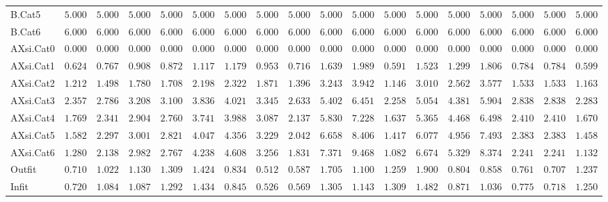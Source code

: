 \documentclass[6pt]{article}
\begin{document}
{\begin{longtable}{lrrrrrrrrrrrrrrrrr}
B.Cat5&$ 5.000$&$ 5.000$&$ 5.000$&$ 5.000$&$ 5.000$&$ 5.000$&$ 5.000$&$ 5.000$&$ 5.000$&$ 5.000$&$ 5.000$&$ 5.000$&$ 5.000$&$ 5.000$&$ 5.000$&$ 5.000$&$ 5.000$\tabularnewline
B.Cat6&$ 6.000$&$ 6.000$&$ 6.000$&$ 6.000$&$ 6.000$&$ 6.000$&$ 6.000$&$ 6.000$&$ 6.000$&$ 6.000$&$ 6.000$&$ 6.000$&$ 6.000$&$ 6.000$&$ 6.000$&$ 6.000$&$ 6.000$\tabularnewline
AXsi.Cat0&$ 0.000$&$ 0.000$&$ 0.000$&$ 0.000$&$ 0.000$&$ 0.000$&$ 0.000$&$ 0.000$&$ 0.000$&$ 0.000$&$ 0.000$&$ 0.000$&$ 0.000$&$ 0.000$&$ 0.000$&$ 0.000$&$ 0.000$\tabularnewline
AXsi.Cat1&$ 0.624$&$ 0.767$&$ 0.908$&$ 0.872$&$ 1.117$&$ 1.179$&$ 0.953$&$ 0.716$&$ 1.639$&$ 1.989$&$ 0.591$&$ 1.523$&$ 1.299$&$ 1.806$&$ 0.784$&$ 0.784$&$ 0.599$\tabularnewline
AXsi.Cat2&$ 1.212$&$ 1.498$&$ 1.780$&$ 1.708$&$ 2.198$&$ 2.322$&$ 1.871$&$ 1.396$&$ 3.243$&$ 3.942$&$ 1.146$&$ 3.010$&$ 2.562$&$ 3.577$&$ 1.533$&$ 1.533$&$ 1.163$\tabularnewline
AXsi.Cat3&$ 2.357$&$ 2.786$&$ 3.208$&$ 3.100$&$ 3.836$&$ 4.021$&$ 3.345$&$ 2.633$&$ 5.402$&$ 6.451$&$ 2.258$&$ 5.054$&$ 4.381$&$ 5.904$&$ 2.838$&$ 2.838$&$ 2.283$\tabularnewline
AXsi.Cat4&$ 1.769$&$ 2.341$&$ 2.904$&$ 2.760$&$ 3.741$&$ 3.988$&$ 3.087$&$ 2.137$&$ 5.830$&$ 7.228$&$ 1.637$&$ 5.365$&$ 4.468$&$ 6.498$&$ 2.410$&$ 2.410$&$ 1.670$\tabularnewline
AXsi.Cat5&$ 1.582$&$ 2.297$&$ 3.001$&$ 2.821$&$ 4.047$&$ 4.356$&$ 3.229$&$ 2.042$&$ 6.658$&$ 8.406$&$ 1.417$&$ 6.077$&$ 4.956$&$ 7.493$&$ 2.383$&$ 2.383$&$ 1.458$\tabularnewline
AXsi.Cat6&$ 1.280$&$ 2.138$&$ 2.982$&$ 2.767$&$ 4.238$&$ 4.608$&$ 3.256$&$ 1.831$&$ 7.371$&$ 9.468$&$ 1.082$&$ 6.674$&$ 5.329$&$ 8.374$&$ 2.241$&$ 2.241$&$ 1.132$\tabularnewline
Outfit&$ 0.710$&$ 1.022$&$ 1.130$&$ 1.309$&$ 1.424$&$ 0.834$&$ 0.512$&$ 0.587$&$ 1.705$&$ 1.100$&$ 1.259$&$ 1.900$&$ 0.804$&$ 0.858$&$ 0.761$&$ 0.707$&$ 1.237$\tabularnewline
Infit&$ 0.720$&$ 1.084$&$ 1.087$&$ 1.292$&$ 1.434$&$ 0.845$&$ 0.526$&$ 0.569$&$ 1.305$&$ 1.143$&$ 1.309$&$ 1.482$&$ 0.871$&$ 1.036$&$ 0.775$&$ 0.718$&$ 1.250$\tabularnewline
\hline
\end{longtable}}
\end{document}
